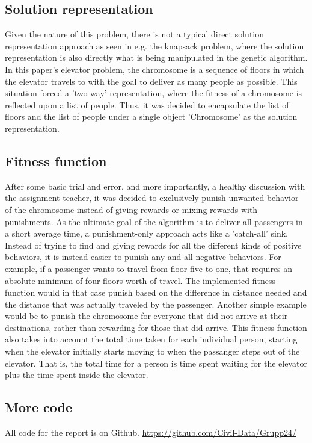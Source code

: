 \subsection{Solution representation}

Given the nature of this problem, there is not a typical direct solution representation approach as seen in e.g. the knapsack problem, where the solution representation is also directly what is being manipulated in the genetic algorithm. In this paper's elevator problem, the chromosome is a sequence of floors in which the elevator travels to with the goal to deliver as many people as possible. This situation forced a 'two-way' representation, where the fitness of a chromosome is reflected upon a list of people. Thus, it was decided to encapsulate the list of floors and the list of people under a single object 'Chromosome' as the solution representation.

\subsection{Fitness function}
\label{subsec:fitness_function}

After some basic trial and error, and more importantly, a healthy discussion with the assignment teacher, it was decided to exclusively punish unwanted behavior of the chromosome instead of giving rewards or mixing rewards with punishments. As the ultimate goal of the algorithm is to deliver all passengers in a short average time, a punishment-only approach acts like a 'catch-all' sink. Instead of trying to find and giving rewards for all the different kinds of positive behaviors, it is instead easier to punish any and all negative behaviors. For example, if a passenger wants to travel from floor five to one, that requires an absolute minimum of four floors worth of travel. The implemented fitness function would in that case punish based on the difference in distance needed and the distance that was actually traveled by the passenger. Another simple example would be to punish the chromosome for everyone that did not arrive at their destinations, rather than rewarding for those that did arrive.  This fitness function also takes into account the total time taken for each individual person, starting when the elevator initially starts moving to when the passanger steps out of the elevator. That is, the total time for a person is time spent waiting for the elevator plus the time spent inside the elevator.

\subsection{More code}
\label{subsec:code}
All code for the report is on Github. 
\url{https://github.com/Civil-Data/Grupp24/}
